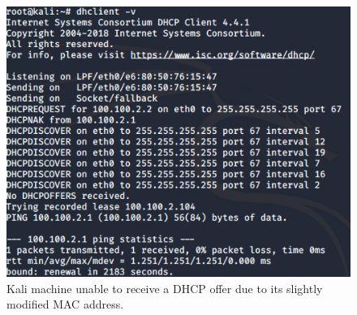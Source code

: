 \begin{figure}[H]
\begin{minipage}{.33\textwidth}
  \includegraphics[width=1\textwidth]{dhcp_kali_macNotOk2.png}
  \caption[a]{Kali machine unable to receive a DHCP offer due to its slightly modified MAC address.}\label{fig:8}
\end{minipage}
\end{figure}

